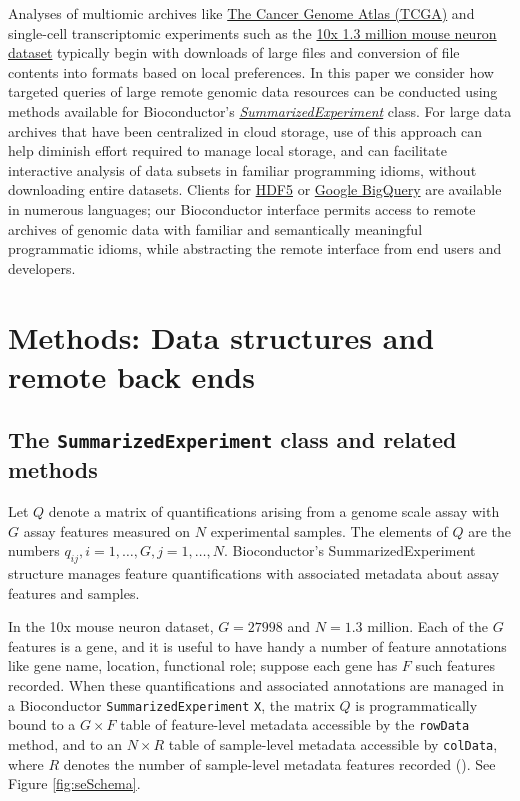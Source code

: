 \documentclass[9pt,a4paper,]{extarticle}
\begin{document}
Analyses of multiomic archives like \href{https://cancergenome.nih.gov/}{The Cancer Genome Atlas (TCGA)}
and single-cell transcriptomic experiments such as the
\href{https://support.10xgenomics.com/single-cell-gene-expression/datasets}{10x 1.3 million
mouse neuron dataset}
typically begin with downloads of large files and
conversion of file contents into formats based on local preferences.
In this paper we consider how targeted queries of large remote genomic
data resources can be conducted using methods available for
Bioconductor's \emph{\href{https://bioconductor.org/packages/3.9/SummarizedExperiment}{SummarizedExperiment}} class.
For large data archives that have been centralized
in cloud storage, use of this approach can help diminish effort
required to manage local storage,
and can facilitate interactive analysis of data
subsets in familiar programming idioms,
without downloading entire datasets.
Clients for
\href{https://www.hdfgroup.org/}{HDF5}
or \href{https://cloud.google.com/bigquery}{Google BigQuery}
are available in numerous languages; our
Bioconductor interface permits access to remote archives of genomic
data with familiar and semantically meaningful programmatic idioms,
while abstracting the remote interface from end users
and developers.

\section{Methods: Data structures and remote back ends}\label{methods-data-structures-and-remote-back-ends}

\subsection{\texorpdfstring{The \texttt{SummarizedExperiment} class and related methods}{The SummarizedExperiment class and related methods}}\label{the-summarizedexperiment-class-and-related-methods}

Let \(Q\) denote a matrix of quantifications arising from a genome
scale assay with \(G\) assay features measured on \(N\) experimental
samples. The elements of \(Q\) are the numbers \(q_{ij}, i = 1, \ldots, G, j = 1, \ldots, N\). Bioconductor's SummarizedExperiment
structure
manages feature quantifications
with associated metadata about assay features
and samples.

In the 10x mouse neuron dataset, \(G=27998\) and \(N=1.3\) million.
Each of the \(G\) features is a gene, and it is useful to
have handy a number of feature annotations like gene name,
location, functional role; suppose each gene has \(F\) such
features recorded.
When these quantifications and
associated annotations are managed in a
Bioconductor \texttt{SummarizedExperiment} \texttt{X}, the matrix \(Q\) is programmatically bound to a \(G \times F\)
table of feature-level metadata
accessible by the \texttt{rowData} method, and to an \(N \times R\) table of sample-level metadata accessible by \texttt{colData},
where \(R\) denotes the number of sample-level metadata
features recorded (\citet{Huber2015}). See Figure \ref{fig:seSchema}.
\end{document}
